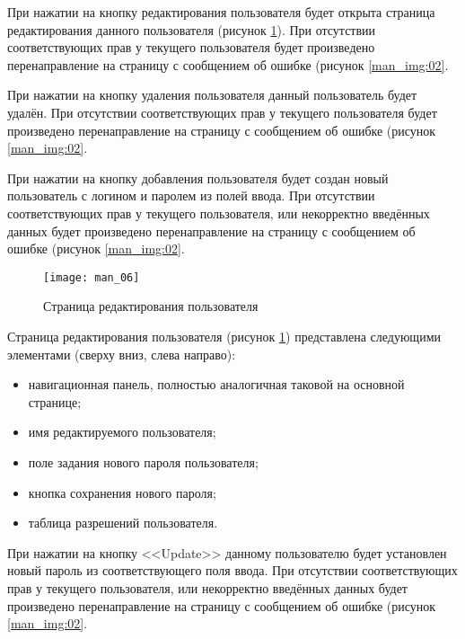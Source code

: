 При нажатии на кнопку редактирования пользователя будет открыта страница редактирования данного пользователя (рисунок \ref{man_img:06}). При отсутствии соответствующих прав у текущего пользователя будет произведено перенаправление на страницу с сообщением об ошибке (рисунок \ref{man_img:02}.\par

При нажатии на кнопку удаления пользователя данный пользователь будет удалён. При отсутствии соответствующих прав у текущего пользователя будет произведено перенаправление на страницу с сообщением об ошибке (рисунок \ref{man_img:02}.\par

При нажатии на кнопку добавления пользователя будет создан новый пользователь с логином и паролем из полей ввода. При отсутствии соответствующих прав у текущего пользователя, или некорректно введённых данных будет произведено перенаправление на страницу с сообщением об ошибке (рисунок \ref{man_img:02}.\par

\begin{figure}[h!]
    \centering
    \texttt{[image: man\_06]}
    \caption{Страница редактирования пользователя}
    \label{man_img:06}
\end{figure}

Страница редактирования пользователя (рисунок \ref{man_img:06}) представлена следующими элементами (сверху вниз, слева направо):
\begin{itemize}
    \item навигационная панель, полностью аналогичная таковой на основной странице;
    \item имя редактируемого пользователя;
    \item поле задания нового пароля пользователя;
    \item кнопка сохранения нового пароля;
    \item таблица разрешений пользователя.
\end{itemize}

При нажатии на кнопку <<Update>> данному пользователю будет установлен новый пароль из соответствующего поля ввода. При отсутствии соответствующих прав у текущего пользователя, или некорректно введённых данных будет произведено перенаправление на страницу с сообщением об ошибке (рисунок \ref{man_img:02}.\par

